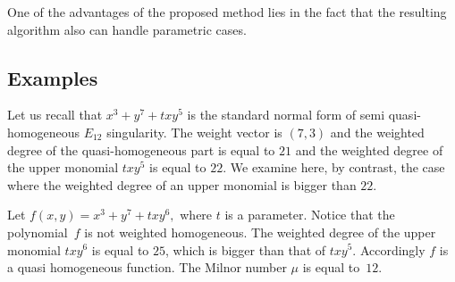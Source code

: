 \documentclass[10pt,a4paper]{amsart}
\numberwithin{equation}{section}
\begin{document}
One of the advantages of the proposed method lies in the fact that the resulting algorithm also can handle parametric cases.

\subsection{Examples}

Let us recall that $ x^3+y^7+txy^5 $ is the standard normal form of semi quasi-homogeneous $E_{12}$ singularity. The weight vector is $(7,3)$ and the weighted degree of the quasi-homogeneous part is equal to $21$ and the weighted degree of the upper monomial $ txy^5 $ is equal to $22$. We examine here, by contrast, the case where the weighted degree of an upper monomial is bigger than $ 22.$

\begin{Example}
Let $ f(x,y)=x^3+y^7+txy^6, $ where $t$ is a parameter. Notice that the polyno\-mial~$f$ is not weighted homogeneous. The weighted degree of the upper monomial $ txy^6 $ is equal to $25$, which is bigger than that of $ txy^5$. Accordingly $f$ is a quasi homogeneous function. The Milnor number $\mu$ is equal to~$12$.


\end{Example}
\end{document}
